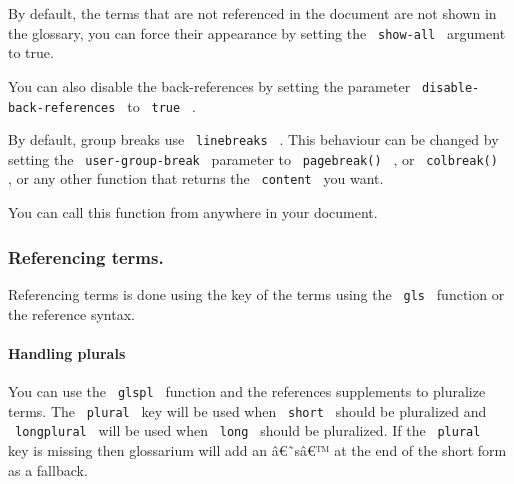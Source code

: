 \begin{Shaded}
\begin{Highlighting}[]
\end{Highlighting}
\end{Shaded}

By default, the terms that are not referenced in the document are not
shown in the glossary, you can force their appearance by setting the
\texttt{\ show-all\ } argument to true.

You can also disable the back-references by setting the parameter
\texttt{\ disable-back-references\ } to \texttt{\ true\ } .

By default, group breaks use \texttt{\ linebreaks\ } . This behaviour
can be changed by setting the \texttt{\ user-group-break\ } parameter to
\texttt{\ pagebreak()\ } , or \texttt{\ colbreak()\ } , or any other
function that returns the \texttt{\ content\ } you want.

You can call this function from anywhere in your document.

\subsubsection{Referencing terms.}\label{referencing-terms.}

Referencing terms is done using the key of the terms using the
\texttt{\ gls\ } function or the reference syntax.

\begin{Shaded}
\begin{Highlighting}[]

\end{Highlighting}
\end{Shaded}

\paragraph{Handling plurals}\label{handling-plurals}

You can use the \texttt{\ glspl\ } function and the references
supplements to pluralize terms. The \texttt{\ plural\ } key will be used
when \texttt{\ short\ } should be pluralized and \texttt{\ longplural\ }
will be used when \texttt{\ long\ } should be pluralized. If the
\texttt{\ plural\ } key is missing then glossarium will add an â€˜sâ€™
at the end of the short form as a fallback.


